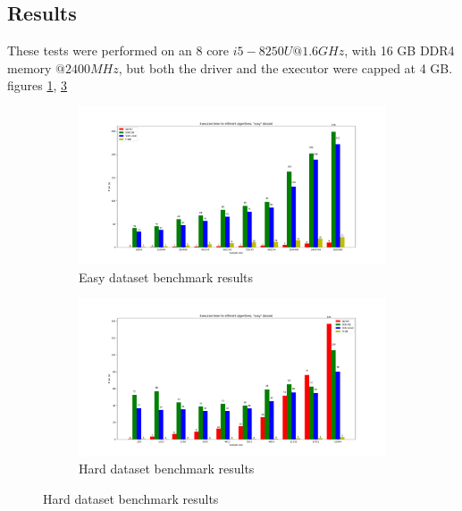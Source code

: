 \documentclass[a4paper]{article}
\begin{document}
	\subsection{Results}
	These tests were performed on an 8 core $i5-8250U @1.6GHz$, with 16 GB DDR4 memory $@2400MHz$, but both the driver and the executor were capped at 4 GB.
	figures \ref{fig:easybenchmark}, \ref{fig:hardbenchmark}

	\begin{figure}[h]
		\centering
		\begin{subfigure}[b]{1\textwidth}
			\centering
			\includegraphics[width=\textwidth]{benchmarkeasy.png}
         	\caption{Easy dataset benchmark results}
         	\label{fig:easybenchmark}
		\end{subfigure}
		\hfill
		
		\begin{subfigure}[b]{1\textwidth}
			\centering
			\includegraphics[width=\textwidth]{benchmarkhard.png}
         	\caption{Hard dataset benchmark results}
         	\label{fig:hardbenchmark}
		\end{subfigure}
		\hfill
		
	\end{figure}
\end{document}
